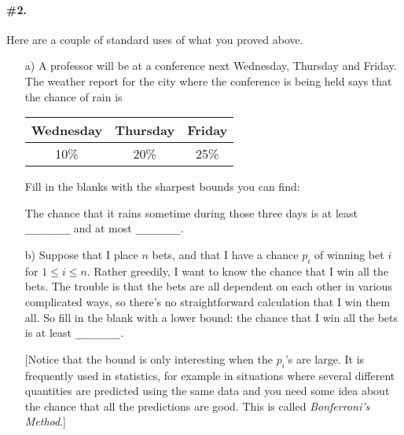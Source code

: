 \documentclass[12pt,titlepage]{article}
\begin{document}
\paragraph{\#2.} Here are a couple of standard uses of what you proved above.
\begin{enumerate}
\item[a)] A professor will be at a conference next Wednesday, Thursday and Friday. The weather report for the city where the conference is being held says that the chance of rain is 

\begin{center}
\begin{tabular}{c|c|c}
Wednesday & Thursday & Friday \\
\hline 
10\% & 20\% & 25\%
\end{tabular}
\end{center}
Fill in the blanks with the sharpest bounds you can find:

The chance that it rains sometime during those three days is at least \verb|________| and at most \verb|________|.

\item[b)] Suppose that I place $n$ bets, and that I have a chance $p_i$ of winning bet $i$ for $1 \leq i \leq n$. Rather greedily, I want to know the chance that I win all the bets. The trouble is that the bets are all dependent on each other in various complicated ways, so there's no straightforward calculation that I win them all. So fill in the blank with a lower bound: the chance that I win all the bets is at least \verb|________|.

[Notice that the bound is only interesting when the $p_i$'s are large. It is frequently used in statistics, for example in situations where several different quantities are predicted using the same data and you need some idea about the chance that all the predictions are good. This is called \textit{Bonferroni's Method}.]
\end{enumerate}
\end{document}
